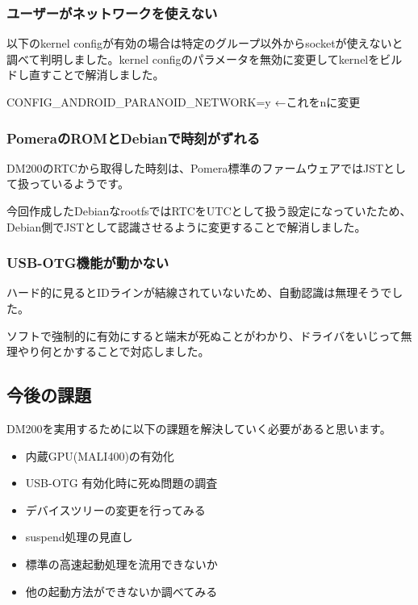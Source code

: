 \documentclass[mingoth,a4paper]{jsarticle}
\begin{document}
\subsubsection{ユーザーがネットワークを使えない}

以下のkernel configが有効の場合は特定のグループ以外からsocketが使えないと調べて判明しました。kernel configのパラメータを無効に変更してkernelをビルドし直すことで解消しました。

\begin{commandline}
CONFIG_ANDROID_PARANOID_NETWORK=y ←これをnに変更
\end{commandline}


\subsubsection{PomeraのROMとDebianで時刻がずれる}

DM200のRTCから取得した時刻は、Pomera標準のファームウェアではJSTとして扱っているようです。

今回作成したDebianなrootfsではRTCをUTCとして扱う設定になっていたため、Debian側でJSTとして認識させるように変更することで解消しました。


\subsubsection{USB-OTG機能が動かない}

ハード的に見るとIDラインが結線されていないため、自動認識は無理そうでした。

ソフトで強制的に有効にすると端末が死ぬことがわかり、ドライバをいじって無理やり何とかすることで対応しました。


\subsection{今後の課題}

DM200を実用するために以下の課題を解決していく必要があると思います。

\begin{itemize}
\item 内蔵GPU(MALI400)の有効化
\item USB-OTG 有効化時に死ぬ問題の調査
\item デバイスツリーの変更を行ってみる
\item suspend処理の見直し
\item 標準の高速起動処理を流用できないか
\item 他の起動方法ができないか調べてみる
\end{itemize}
\end{document}
